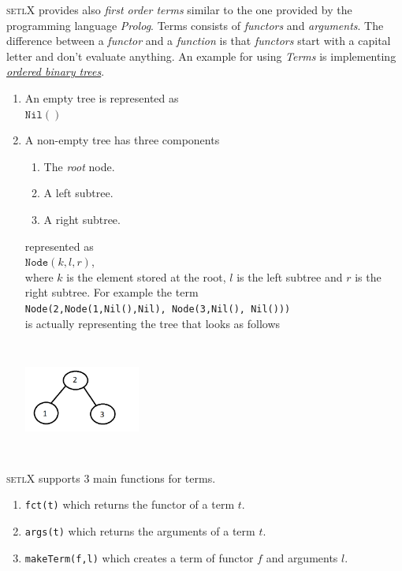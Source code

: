 \documentclass[11pt]{report}
\begin{document}
\textsc{setlX} provides also \textsl{first order terms} similar to the one provided by the programming language \textsl{Prolog}. Terms consists of \textsl{functors} and \textsl{arguments}. The difference between a \textsl{functor} and a \textsl{function} is that \textsl{functors} start with a capital letter and don't evaluate anything. An example for using \textsl{Terms} is implementing \href{http://en.wikipedia.org/wiki/Binary_search_tree}{\emph{ordered binary trees}}.
\begin{enumerate}
\item An empty tree is represented as
      \\[0.2cm]
      \hspace*{1.3cm}
      $\mathtt{Nil()}$
      \\[0.2cm]
\item A non-empty tree has three components
      \begin{enumerate}
      \item The \emph{root} node.
      \item A left subtree.
      \item A right subtree.
      \end{enumerate}
represented as 
	  \\[0.2cm]
      \hspace*{1.3cm}
      $\texttt{Node}(k, l, r)$,
      \\[0.2cm]
where $k$ is the element stored at the root, $l$ is the left subtree and $r$ is the right subtree. For example the term
\\[0.2cm]
\hspace*{1.3cm}
\texttt{Node(2,Node(1,Nil(),Nil), Node(3,Nil(), Nil()))}
\\[0.2cm]
is actually representing the tree that looks as follows
\begin{center} \includegraphics[width=1.5in, height=1.5in, scale=1, angle=0]{binary-tree.png} \end{center}
\end{enumerate}
\textsc{setlX} supports 3 main functions for terms.
\begin{enumerate}
\item \texttt{fct(t)} which returns the functor of a term $t$.
\item \texttt{args(t)} which returns the arguments of a term $t$.
\item \texttt{makeTerm(f,l)} which creates a term of functor $f$ and arguments $l$.
\end{enumerate}
\end{document}
